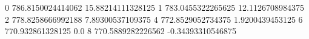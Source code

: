 0 786.8150024414062 15.88214111328125
1 783.0455322265625 12.1126708984375
2 778.8258666992188 7.89300537109375
4 772.8529052734375 1.9200439453125
6 770.932861328125 0.0
8 770.5889282226562 -0.34393310546875
